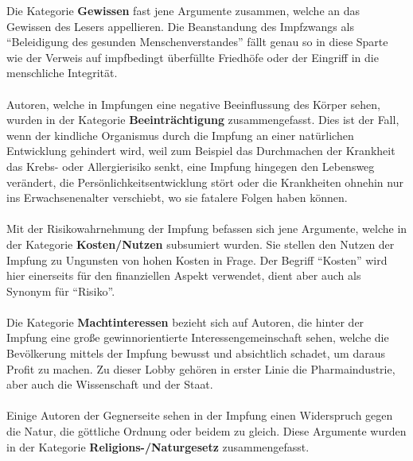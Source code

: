 \documentclass[
    a4paper,
    12pt,
    hyphens,
    chapterprefix=true,
    headheight=33pt,
    footheight=29pt,
    headings=optiontohead, %
]{scrartcl}
\begin{document}
\newpage
Die Kategorie \textbf{Gewissen} fast jene Argumente zusammen, welche an das Gewissen des Lesers appellieren. Die Beanstandung des Impfzwangs als "`Beleidigung des gesunden Menschenverstandes"' fällt genau so in diese Sparte wie der Verweis auf impfbedingt überfüllte Friedhöfe oder der Eingriff in die menschliche Integrität.\\
\\
Autoren, welche in Impfungen eine negative Beeinflussung des Körper sehen, wurden in der Kategorie \textbf{Beeinträchtigung} zusammengefasst. Dies ist der Fall, wenn der kindliche Organismus durch die Impfung an einer natürlichen Entwicklung gehindert wird, weil zum Beispiel das Durchmachen der Krankheit das Krebs- oder Allergierisiko senkt, eine Impfung hingegen den Lebensweg verändert, die Persönlichkeitsentwicklung stört oder die Krankheiten ohnehin nur ins Erwachsenenalter verschiebt, wo sie fatalere Folgen haben können.\\
\\
Mit der Risikowahrnehmung der Impfung befassen sich jene Argumente, welche in der Kategorie \textbf{Kosten/Nutzen} subsumiert wurden. Sie stellen den Nutzen der Impfung zu Ungunsten von hohen Kosten in Frage. Der Begriff "`Kosten"' wird hier einerseits für den finanziellen Aspekt verwendet, dient aber auch als Synonym für "`Risiko"'.\\
\\
Die Kategorie \textbf{Machtinteressen} bezieht sich auf Autoren, die hinter der Impfung eine große gewinnorientierte Interessengemeinschaft sehen, welche die Bevölkerung mittels der Impfung bewusst und absichtlich schadet, um daraus Profit zu machen. Zu dieser Lobby gehören in erster Linie die Pharmaindustrie, aber auch die Wissenschaft und der Staat.\\
\\
Einige Autoren der Gegnerseite sehen in der Impfung einen Widerspruch gegen die Natur, die göttliche Ordnung oder beidem zu gleich. Diese Argumente wurden in der Kategorie \textbf{Religions-/Naturgesetz} zusammengefasst.\\
\end{document}
